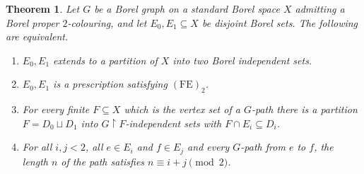 \documentclass[11pt,reqno]{amsart}
\theoremstyle{plain}
\newtheorem{theorem}{Theorem}[section]
\theoremstyle{definition}
\theoremstyle{remark}
\newcommand{\restr}{\mathbin{\upharpoonright}}
\begin{document}
\begin{theorem}
\label{thm:two}
Let $G$ be a Borel graph on a standard Borel space $X$ admitting a Borel
proper $2$-colouring, and let $E_0,E_1\subseteq X$ be disjoint Borel sets. The
following are equivalent.
\begin{enumerate}
\item[(i)] $E_0,E_1$ extends to a partition of $X$ into two Borel
independent sets.
\item[(ii)] $E_0,E_1$ is a prescription satisfying $\mathrm{(FE)}_2$.
\item[(iii)] For every finite $F\subseteq X$ which is the vertex set of a
$G$-path there is a partition $F=D_0\sqcup D_1$ into
$G\restr F$-independent sets with $F\cap E_i\subseteq D_i$.
\item[(iv)] For all $i,j<2$, all $e\in E_i$ and $f\in E_j$ and every
$G$-path from $e$ to $f$, the length $n$ of the path satisfies
$n\equiv i+j\pmod 2$.
\end{enumerate}
\end{theorem}
\end{document}
